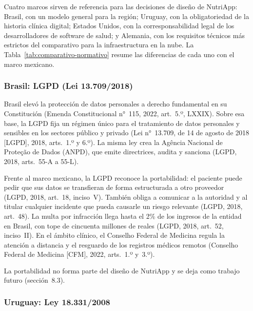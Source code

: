 \documentclass[12pt, a4paper]{article}
\begin{document}
Cuatro marcos sirven de referencia para las decisiones de diseño de
NutriApp: Brasil, con un modelo general para la región; Uruguay, con
la obligatoriedad de la historia clínica digital; Estados Unidos, con
la corresponsabilidad legal de los desarrolladores de software de
salud; y Alemania, con los requisitos técnicos más estrictos del
comparativo para la infraestructura en la nube. La
Tabla~\ref{tab:comparativo-normativo} resume las diferencias de cada
uno con el marco mexicano.

\subsubsection{Brasil: LGPD (Lei 13.709/2018)}

Brasil elevó la protección de datos personales a derecho fundamental
en su Constitución (Emenda Constitucional n°~115, 2022, art.~5.º,
LXXIX). Sobre esa base, la LGPD fija un régimen único para el
tratamiento de datos personales y sensibles en los sectores público y
privado (Lei n°~13.709, de 14 de agosto de 2018 [LGPD], 2018,
arts.~1.º y 6.º). La misma ley crea la Agência Nacional de
Proteção de Dados (ANPD), que emite directrices, audita y sanciona (LGPD,
2018, arts.~55-A a 55-L).
 
Frente al marco mexicano, la LGPD reconoce la portabilidad: el paciente
puede pedir que sus datos se transfieran de forma estructurada a otro
proveedor (LGPD, 2018, art.~18, inciso~V). También obliga a comunicar a
la autoridad y al titular cualquier incidente que pueda causarle un
riesgo relevante (LGPD, 2018, art.~48). La
multa por infracción llega hasta el 2\% de los ingresos de la entidad
en Brasil, con tope de cincuenta millones de reales (LGPD, 2018,
art.~52, inciso~II). En el ámbito clínico, el Conselho Federal de
Medicina regula la atención a distancia y el resguardo de los
registros médicos remotos (Conselho Federal de Medicina [CFM], 2022,
arts.~1.º y~3.º).
 
La portabilidad no forma parte del diseño de NutriApp y se
deja como trabajo futuro (sección~8.3).

\subsubsection{Uruguay: Ley 18.331/2008}
 
\end{document}
